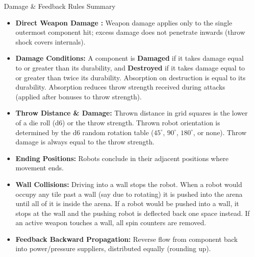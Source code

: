 \documentclass[11pt,a4paper]{article}
\newcommand{\inlineIcon}[1]{\raisebox{-0.22ex}{\resizebox{!}{1.15em}{#1}}}
\begin{document}
\begin{summarybox}{Damage \& Feedback Rules Summary}
\small
\begin{itemize}[leftmargin=*, itemsep=1.5pt, topsep=1pt, parsep=0pt]
  \item \textbf{Direct Weapon Damage \inlineIcon{\resourceW}:} Weapon damage \inlineIcon{\resourceW} applies only to the single outermost component hit; excess damage does not penetrate inwards (throw shock covers internals).
  \item \textbf{Damage Conditions:} A component is \textbf{Damaged} if it takes damage equal to or greater than its durability, and \textbf{Destroyed} if it takes damage equal to or greater than twice its durability. Absorption on destruction is equal to its durability. Absorption reduces throw strength received during attacks (applied after bonuses to throw strength).
  \item \textbf{Throw Distance \& Damage:} Thrown distance in grid squares is the lower of a die roll (d6) or the throw strength. Thrown robot orientation is determined by the d6 random rotation table ($45^\circ$, $90^\circ$, $180^\circ$, or none). Throw damage is always equal to the throw strength.
  \item \textbf{Ending Positions:} Robots conclude in their adjacent positions where movement ends.
  \item \textbf{Wall Collisions:} Driving into a wall stops the robot. When a robot would occupy any tile past a wall (say due to rotating) it is pushed into the arena until all of it is inside the arena. If a robot would be pushed into a wall, it stops at the wall and the pushing robot is deflected back one space instead. If an active weapon touches a wall, all spin counters are removed.
  \item \textbf{Feedback Backward Propagation:} Reverse flow from component back into power/pressure suppliers, distributed equally (rounding up).
\end{itemize}
\end{summarybox}
\end{document}
